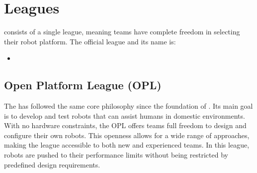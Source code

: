 \section{Leagues}\label{sec:leagues}

\AtHome{} consists of a single league, meaning teams have complete freedom in selecting their robot platform. The official league and its name is:
\begin{itemize}
  \item \OPL{}
\end{itemize}

\subsection{Open Platform League (OPL)}

The \OPL{} has followed the same core philosophy since the foundation of \AtHome{}.
Its main goal is to develop and test robots that can assist humans in domestic environments.
With no hardware constraints, the OPL offers teams full freedom to design and configure their own robots.
This openness allows for a wide range of approaches, making the league accessible to both new and experienced teams.
In this league, robots are pushed to their performance limits without being restricted by predefined design requirements.